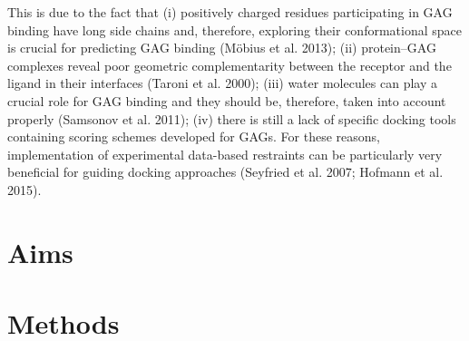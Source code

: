 \documentclass[journal=jctcce,manuscript=article]{achemso}
\begin{document}
{This is due to the fact that (i) positively charged residues participating in GAG binding have long side chains and, therefore, exploring their conformational space is crucial for predicting GAG binding (Möbius et al. 2013); (ii) protein–GAG complexes reveal poor geometric complementarity between the receptor and the ligand in their interfaces (Taroni et al. 2000); (iii) water molecules can play a crucial role for GAG binding and they should be, therefore, taken into account properly (Samsonov et al. 2011); (iv) there is still a lack of specific docking tools containing scoring schemes developed for GAGs. For these reasons, implementation of experimental data-based restraints can be particularly very beneficial for guiding docking approaches (Seyfried et al. 2007; Hofmann et al. 2015).

\pagebreak
\section{Aims}

\section{Methods}



}
\newpage
{

}





\end{document}
